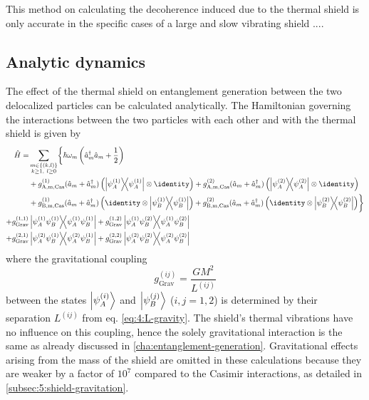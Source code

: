 This method on calculating the decoherence induced due to the thermal shield is only accurate in the specific cases of a large and slow vibrating shield ....


\subsection{Analytic dynamics}\label{subsec:5:entanglement-analytical}
The effect of the thermal shield on entanglement generation between the two delocalized particles can be calculated analytically.
The Hamiltonian governing the interactions between the two particles with each other and with the thermal shield is given by
\begin{align}\label{eq:5:hamiltonian}
  \begin{split}
    \op{H} = &\sum_{\substack{m\in\{(k,l)\}\\ k \geq 1,\ l \geq 0}} \biggl\{ \hbar \omega_m \left(\op{a}^\dagger_m \op{a}_m + \frac{1}{2}\right) \\
    &+ g^{(1)}_\mathrm{A,m,Cas}(\op{a}_m + \op{a}^\dagger_m) \left( \ketbra{\psi^{(1)}_A} \otimes \identity \right)
     + g^{(2)}_\mathrm{A,m,Cas}(\op{a}_m + \op{a}^\dagger_m) \left( \ketbra{\psi^{(2)}_A} \otimes \identity \right) \\
    &+ g^{(1)}_\mathrm{B,m,Cas}(\op{a}_m + \op{a}^\dagger_m) \left( \identity \otimes \ketbra{\psi^{(1)}_B} \right)
     + g^{(2)}_\mathrm{B,m,Cas}(\op{a}_m + \op{a}^\dagger_m) \left( \identity \otimes \ketbra{\psi^{(2)}_B} \right)\biggr\} \\
    + g^{(1,1)}_\mathrm{Grav}&\ketbra{\psi^{(1)}_A \psi^{(1)}_B} + g^{(1,2)}_\mathrm{Grav}\ketbra{\psi^{(1)}_A \psi^{(2)}_B} \\
    + g^{(2,1)}_\mathrm{Grav}&\ketbra{\psi^{(2)}_A \psi^{(1)}_B} + g^{(2,2)}_\mathrm{Grav}\ketbra{\psi^{(2)}_A \psi^{(2)}_B}
  \end{split}
\end{align}
where the gravitational coupling
\begin{equation}
  g^{(ij)}_\mathrm{Grav} = \frac{G M^2}{L^{(ij)}}
\end{equation}
between the states $\ket{\psi^{(i)}_A}$ and $\ket{\psi^{(j)}_B}$ ($i,j = 1,2$) is determined by their separation $L^{(ij)}$ from eq. \eqref{eq:4:L-gravity}.
The shield's thermal vibrations have no influence on this coupling, hence the solely gravitational interaction is the same as already discussed in \cref{cha:entanglement-generation}.
Gravitational effects arising from the mass of the shield are omitted in these calculations because they are weaker by a factor of $10^7$ compared to the Casimir interactions, as detailed in \cref{subsec:5:shield-gravitation}.

